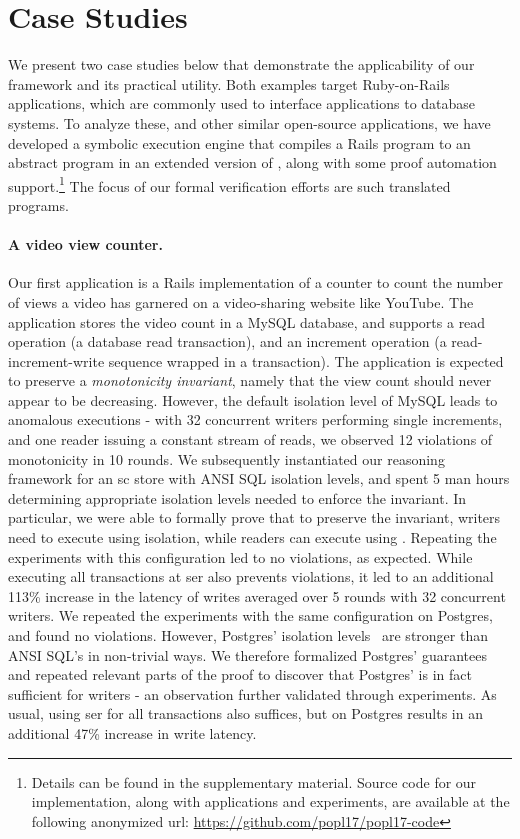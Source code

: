 \vspace*{-4pt}
\section{Case Studies}
\label{sec:case-studies}

We present two case studies below that demonstrate the applicability
of our framework and its practical utility. Both examples
target Ruby-on-Rails applications, which are commonly used to
interface applications to database systems. To analyze these, and
other similar open-source applications, we have developed a symbolic
execution engine that compiles a Rails program to an abstract program
in an extended version of \txnimp, along with some proof automation
support.\footnote{Details can be found in the supplementary material.
  Source code for our implementation, along with applications and
  experiments, are available at the following anonymized url:
  \url{https://github.com/popl17/popl17-code}} The focus of our formal
verification efforts are such translated \txnimp programs.

\paragraph{A video view counter.} Our first application is a Rails
implementation of a counter to count the number of views a video has
garnered on a video-sharing website like YouTube. The application
stores the video count in a MySQL database, and supports a read
operation (a database read transaction), and an increment operation (a
read-increment-write sequence wrapped in a transaction).  The
application is expected to preserve a \emph{monotonicity invariant},
namely that the view count should never appear to be decreasing.
However, the default  isolation level of MySQL
leads to anomalous executions - with 32 concurrent writers performing
single increments, and one reader issuing a constant stream of reads,
we observed 12 violations of monotonicity in 10 rounds. We
subsequently instantiated our reasoning framework for an {\sc sc}
store with ANSI SQL isolation levels, and spent 5 man hours
determining appropriate isolation levels needed to enforce the
invariant. In particular, we were able to formally prove that to
preserve the invariant, writers need to execute using
 isolation, while readers can execute using
. Repeating the experiments with this
configuration led to no violations, as expected. While executing all
transactions at {\sc ser} also prevents violations, it led to an
additional 113\% increase in the latency of writes averaged over 5
rounds with 32 concurrent writers.  We repeated the experiments with
the same configuration on Postgres, and found no violations. However,
Postgres' isolation levels~\cite{postgresiso} are stronger than ANSI
SQL's in non-trivial ways. We therefore formalized Postgres'
guarantees and repeated relevant parts of the proof to discover that
Postgres'  is in fact sufficient for writers - an
observation further validated through experiments. As usual, using
{\sc ser} for all transactions also suffices, but on Postgres results
in an additional 47\% increase in write latency.

